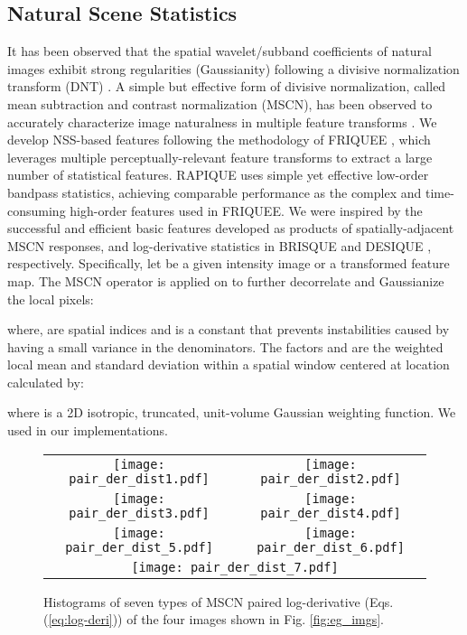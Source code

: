 \documentclass[transmag]{IEEEtran}
\begin{document}
\subsection{Natural Scene Statistics}
\label{ssec:nss_model}

It has been observed that the spatial wavelet/subband coefficients of natural images exhibit strong regularities (Gaussianity) following a divisive normalization transform (DNT) \cite{moorthy2011blind}. 
A simple but effective form of divisive normalization, called mean subtraction and contrast normalization (MSCN), has been observed to accurately characterize image naturalness in multiple feature transforms \cite{mittal2012no, kundu2017no, ghadiyaram2017perceptual, zhang2013no}. We develop NSS-based features following the methodology of FRIQUEE \cite{ghadiyaram2017perceptual}, which leverages multiple perceptually-relevant feature transforms to extract a large number of statistical features. RAPIQUE uses simple yet effective low-order bandpass statistics, achieving comparable performance as the complex and time-consuming high-order features used in FRIQUEE. We were inspired by the successful and efficient basic features developed as products of spatially-adjacent MSCN responses, and log-derivative statistics in BRISQUE \cite{mittal2012no} and DESIQUE \cite{zhang2013no}, respectively. Specifically, let  be a given intensity image or a transformed feature map. The MSCN operator is applied on  to further decorrelate and Gaussianize the local pixels:

where,  are spatial indices and  is a constant that prevents instabilities caused by having a small variance in the denominators. The factors  and  are the weighted local mean and standard deviation within a spatial window centered at location  calculated by:


where  is a 2D isotropic, truncated, unit-volume Gaussian weighting function. We used  in our implementations.

\begin{figure}[!t]
\centering
\footnotesize
\def\xheight{0.485}
\setlength{\tabcolsep}{1pt}
\begin{tabular}{cc}
\texttt{[image: pair\_der\_dist1.pdf]} &
\texttt{[image: pair\_der\_dist2.pdf]} \\
\texttt{[image: pair\_der\_dist3.pdf]} &
\texttt{[image: pair\_der\_dist4.pdf]} \\
\texttt{[image: pair\_der\_dist\_5.pdf]} &
\texttt{[image: pair\_der\_dist\_6.pdf]} \\
\multicolumn{2}{c}{\texttt{[image: pair\_der\_dist\_7.pdf]}}  \\
\end{tabular}
\caption{Histograms of seven types of MSCN paired log-derivative (Eqs. (\ref{eq:log-deri})) of the four images shown in Fig. \ref{fig:eg_imgs}.}
\label{fig:log_deri}
\end{figure}
\end{document}
